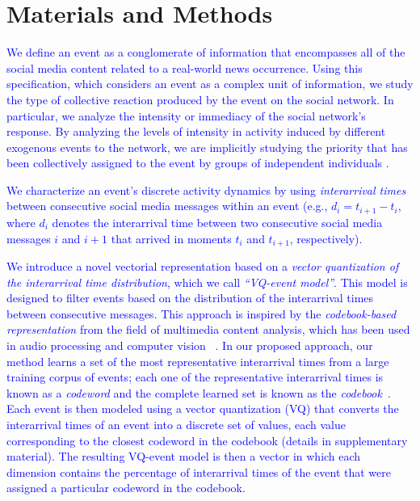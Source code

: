 \documentclass[10pt,letterpaper]{article}
\begin{document}
\section*{Materials and Methods}

\textcolor{blue}{We define an event as a conglomerate of information that encompasses
all of the social media content related to a real-world news
occurrence. Using this specification, which considers an event as a
complex unit of information, we study the type of collective reaction
produced by the event on the social network. In particular, we analyze 
the intensity or immediacy of the social network's response. 
By analyzing the levels of intensity in activity induced by different exogenous
events to the network, we are implicitly studying the priority that has been
collectively assigned to the event by groups of
independent individuals \cite{barabasi2005origin, karsai2012universal}. }

\textcolor{blue}{We characterize an event's discrete activity dynamics by using
\emph{interarrival times} between consecutive social media messages
within an event (e.g., $d_i = t_{i+1}-t_i$, where $d_i$ denotes the
interarrival time between two consecutive social media messages $i$
and $i+1$ that arrived in moments $t_i$ and $t_{i+1}$, respectively).}


\textcolor{blue}{We introduce a novel vectorial representation based on a {\em vector
quantization of the interarrival time distribution}, which we call 
{\em ``VQ-event model''}. This model is
designed to filter events based on the distribution of the
interarrival times between consecutive messages.  This approach is inspired
by the {\em codebook-based representation} from the field of multimedia
content
analysis, which has been used in audio processing and computer vision
~\cite{ff,Vaizman}.  In our proposed approach, our method learns a set of
the most
representative interarrival times from a large training corpus of events;
each one of the representative interarrival times is known as a
{\em codeword} and the complete learned set is known as the {\em
codebook}~\cite{Vaizman}.  
Each event is then modeled using a vector quantization (VQ) that
converts the interarrival times of an event into a discrete set of values,
each value corresponding to the closest codeword in the codebook (details
in supplementary material).  The resulting VQ-event model is then a
vector in which each dimension contains the percentage of interarrival times
of the event that were assigned a particular codeword in the codebook.}
\end{document}

